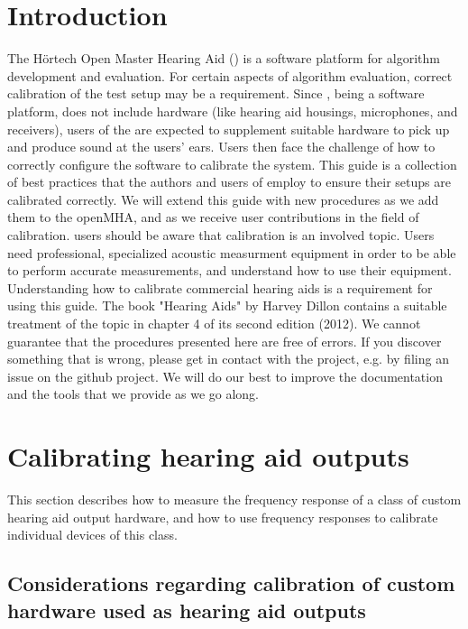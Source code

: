 \documentclass[11pt,a4paper,twoside]{article}
\newcommand{\+}{\discretionary{\mbox{\scriptsize$\hookleftarrow$}}{}{}}
\begin{document}
\newpage
\MHAcopyright{}
\newpage
\tableofcontents
\newpage
\renewcommand{\leftmark}{\rightmark}

\section{Introduction}

The H\"{o}rtech Open Master Hearing Aid (\mha{}) is a software platform
for algorithm development and evaluation.
%
For certain aspects of algorithm evaluation, correct calibration of the
test setup may be a requirement.
%
Since \mha{}, being a software platform, does not include hardware
(like hearing aid housings, microphones, and receivers),
users of the \mha{} are expected to supplement suitable hardware
to pick up and produce sound at the users' ears.
%
Users then face the challenge of how to correctly configure the software
to calibrate the system.
%
This guide is a collection of best practices that the authors and users
of \mha{} employ to ensure their setups are calibrated correctly.
%
We will extend this guide with new procedures as we add them to the
openMHA, and as we receive user contributions in the field of
calibration.
%
\mha{} users should be aware that calibration is an involved topic.
%
Users need professional, specialized acoustic measurment equipment in
order to be able to perform accurate measurements, and understand
how to use their equipment.
%
Understanding how to calibrate commercial hearing aids is a requirement
for using this guide.
%
The book "Hearing Aids" by Harvey Dillon contains a suitable treatment
of the topic in chapter 4 of its second edition (2012).
%
We cannot guarantee that the procedures presented here are free of
errors.
%
If you discover something that is wrong, please get in contact with
the \mha{} project, e.g. by filing an issue on the github project.
%
We will do our best to improve the documentation and the tools that we
provide as we go along.

\section{Calibrating hearing aid outputs}

This section describes how to measure the frequency response of a
class of custom hearing aid output hardware, and how to use frequency
responses to calibrate individual devices of this class.

%

\subsection{Considerations regarding calibration of custom hardware used as hearing aid outputs}
\end{document}
